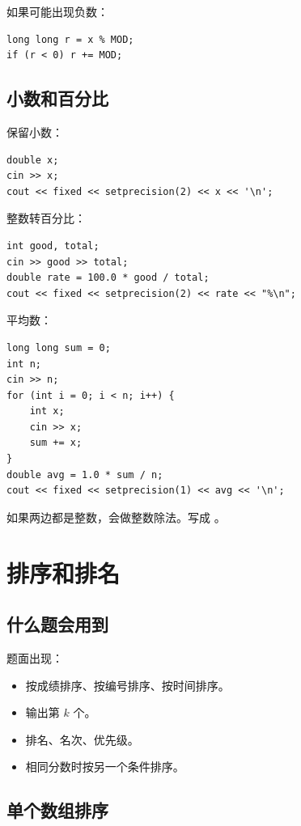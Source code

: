 如果可能出现负数：

\begin{lstlisting}
long long r = x % MOD;
if (r < 0) r += MOD;
\end{lstlisting}

\subsection{小数和百分比}

保留小数：

\begin{lstlisting}
double x;
cin >> x;
cout << fixed << setprecision(2) << x << '\n';
\end{lstlisting}

整数转百分比：

\begin{lstlisting}
int good, total;
cin >> good >> total;
double rate = 100.0 * good / total;
cout << fixed << setprecision(2) << rate << "%\n";
\end{lstlisting}

平均数：

\begin{lstlisting}
long long sum = 0;
int n;
cin >> n;
for (int i = 0; i < n; i++) {
    int x;
    cin >> x;
    sum += x;
}
double avg = 1.0 * sum / n;
cout << fixed << setprecision(1) << avg << '\n';
\end{lstlisting}

 如果两边都是整数，会做整数除法。写成 。

\section{排序和排名}\label{sec:05-11}

\subsection{什么题会用到}

题面出现：

\begin{itemize}
  \item 按成绩排序、按编号排序、按时间排序。
  \item 输出第 $k$ 个。
  \item 排名、名次、优先级。
  \item 相同分数时按另一个条件排序。
\end{itemize}

\subsection{单个数组排序}

